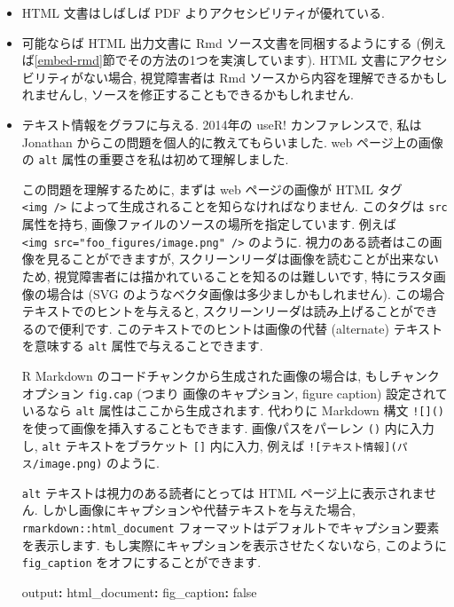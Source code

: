 \documentclass[
  11pt,
]{bxjsreport}
\newenvironment{Shaded}{\begin{snugshade}}{\end{snugshade}}
\newcommand{\AttributeTok}[1]{\textcolor[rgb]{0.77,0.63,0.00}{#1}}
\newcommand{\CharTok}[1]{\textcolor[rgb]{0.31,0.60,0.02}{#1}}
\newcommand{\FunctionTok}[1]{\textcolor[rgb]{0.00,0.00,0.00}{#1}}
\newcommand{\KeywordTok}[1]{\textcolor[rgb]{0.13,0.29,0.53}{\textbf{#1}}}
\begin{document}
\begin{itemize}
\item
  HTML 文書はしばしば PDF よりアクセシビリティが優れている.
\item
  可能ならば HTML 出力文書に Rmd ソース文書を同梱するようにする (例えば\ref{embed-rmd}節でその方法の1つを実演しています). HTML 文書にアクセシビリティがない場合, 視覚障害者は Rmd ソースから内容を理解できるかもしれませんし, ソースを修正することもできるかもしれません.
\item
  テキスト情報をグラフに与える. 2014年の useR! カンファレンスで, 私は Jonathan からこの問題を個人的に教えてもらいました. web ページ上の画像の \texttt{alt} 属性の重要さを私は初めて理解しました.

  この問題を理解するために, まずは web ページの画像が HTML タグ \texttt{\textless{}img\ /\textgreater{}} によって生成されることを知らなければなりません. このタグは \texttt{src} 属性を持ち, 画像ファイルのソースの場所を指定しています. 例えば \texttt{\textless{}img\ src="foo\_figures/image.png"\ /\textgreater{}} のように. 視力のある読者はこの画像を見ることができますが, スクリーンリーダは画像を読むことが出来ないため, 視覚障害者には描かれていることを知るのは難しいです, 特にラスタ画像の場合は (SVG のようなベクタ画像は多少ましかもしれません). この場合テキストでのヒントを与えると, スクリーンリーダは読み上げることができるので便利です. このテキストでのヒントは画像の代替 (alternate) テキストを意味する \texttt{alt} 属性で与えることできます.

  R Markdown のコードチャンクから生成された画像の場合は, もしチャンクオプション \texttt{fig.cap} (つまり 画像のキャプション, figure caption) 設定されているなら \texttt{alt} 属性はここから生成されます. 代わりに Markdown 構文 \texttt{!{[}{]}()} を使って画像を挿入することもできます. 画像パスをパーレン \texttt{()} 内に入力し, \texttt{alt} テキストをブラケット \texttt{{[}{]}} 内に入力, 例えば \texttt{!{[}テキスト情報{]}(パス/image.png)} のように.

  \texttt{alt} テキストは視力のある読者にとっては HTML ページ上に表示されません. しかし画像にキャプションや代替テキストを与えた場合, \texttt{rmarkdown::html\_document} フォーマットはデフォルトでキャプション要素を表示します. もし実際にキャプションを表示させたくないなら, このように \texttt{fig\_caption} をオフにすることができます.

\begin{Shaded}
\begin{Highlighting}[]
\FunctionTok{output}\KeywordTok{:}
\AttributeTok{  }\FunctionTok{html\_document}\KeywordTok{:}
\AttributeTok{    }\FunctionTok{fig\_caption}\KeywordTok{:}\AttributeTok{ }\CharTok{false}
\end{Highlighting}
\end{Shaded}


\end{itemize}
\end{document}
